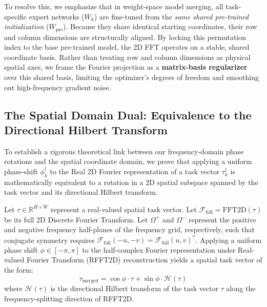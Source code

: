 To resolve this, we emphasize that in weight-space model merging, all task-specific expert networks ($W_k$) are fine-tuned from the \emph{same shared pre-trained initialization} ($W_{\text{pre}}$). Because they share identical starting coordinates, their row and column dimensions are structurally aligned. By locking this permutation index to the base pre-trained model, the 2D FFT operates on a stable, shared coordinate basis. Rather than treating row and column dimensions as physical spatial axes, we frame the Fourier projection as a \textbf{matrix-basis regularizer} over this shared basis, limiting the optimizer's degrees of freedom and smoothing out high-frequency gradient noise.

\subsection{The Spatial Domain Dual: Equivalence to the Directional Hilbert Transform}
\label{sec:hilbert_equivalence}
To establish a rigorous theoretical link between our frequency-domain phase rotations and the spatial coordinate domain, we prove that applying a uniform phase-shift $\phi_k^l$ to the Real 2D Fourier representation of a task vector $\tau_k^l$ is mathematically equivalent to a rotation in a 2D spatial subspace spanned by the task vector and its directional Hilbert transform.

\begin{theorem}
Let $\tau \in \mathbb{R}^{H \times W}$ represent a real-valued spatial task vector. Let $\mathcal{F}_{\text{full}} = \text{FFT2D}(\tau)$ be its full 2D Discrete Fourier Transform. Let $\Omega^+$ and $\Omega^-$ represent the positive and negative frequency half-planes of the frequency grid, respectively, such that conjugate symmetry requires $\mathcal{F}_{\text{full}}(-u, -v) = \mathcal{F}_{\text{full}}(u, v)^*$. Applying a uniform phase shift $\phi \in [-\pi, \pi]$ to the half-complex Fourier representation under Real-valued Fourier Transform (RFFT2D) reconstruction yields a spatial task vector of the form:
\begin{equation}
    \tau_{\text{merged}} = \cos\phi \cdot \tau + \sin\phi \cdot \mathcal{H}(\tau)
\end{equation}
where $\mathcal{H}(\tau)$ is the directional Hilbert transform of the task vector $\tau$ along the frequency-splitting direction of RFFT2D.
\end{theorem}

